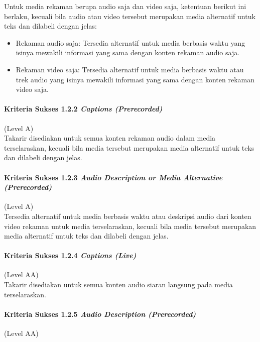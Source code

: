 Untuk media rekaman berupa audio saja dan video saja, ketentuan berikut ini berlaku, kecuali bila audio atau video tersebut merupakan media alternatif untuk teks dan dilabeli dengan jelas:
\begin{itemize}
	\item Rekaman audio saja: Tersedia alternatif untuk media berbasis waktu yang isinya mewakili informasi yang sama dengan konten rekaman audio saja.
	\item Rekaman video saja: Tersedia alternatif untuk media berbasis waktu atau trek audio yang isinya mewakili informasi yang sama dengan konten rekaman video saja.
\end{itemize}

\paragraph{Kriteria Sukses 1.2.2 \textit{Captions (Prerecorded)}}
\label{sec:kriteria_sukses_1.2.2}
(Level A)\\

Takarir disediakan untuk semua konten rekaman audio dalam media terselaraskan, kecuali bila media tersebut merupakan media alternatif untuk teks dan dilabeli dengan jelas.

\paragraph{Kriteria Sukses 1.2.3 \textit{Audio Description or Media Alternative (Prerecorded)}}
\label{sec:kriteria_sukses_1.2.3}
(Level A)\\

Tersedia alternatif untuk media berbasis waktu atau deskripsi audio dari konten video rekaman untuk media terselaraskan, kecuali bila media tersebut merupakan media alternatif untuk teks dan dilabeli dengan jelas.

\paragraph{Kriteria Sukses 1.2.4 \textit{Captions (Live)}}
\label{sec:kriteria_sukses_1.2.4}
(Level AA)\\

Takarir disediakan untuk semua konten audio siaran langsung pada media terselaraskan.

\paragraph{Kriteria Sukses 1.2.5 \textit{Audio Description (Prerecorded)}}
\label{sec:kriteria_sukses_1.2.5}
(Level AA)\\

